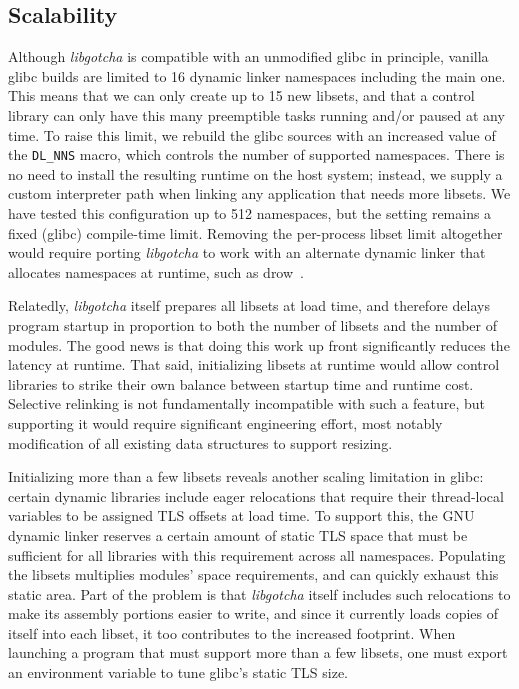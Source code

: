 \subsection{Scalability}
\label{sec:libgotcha:scalability}

Although \textit{libgotcha} is compatible with an unmodified glibc in principle,
vanilla glibc builds are limited to 16 dynamic linker namespaces including the main
one.  This means that we can only create up to 15 new libsets, and that a control
library can only have this many preemptible tasks running and/or paused at any time.
To raise this limit, we rebuild the glibc sources with an increased value of
the \texttt{DL\_NNS} macro, which controls the number of supported namespaces.  There
is no need to install the resulting runtime on the host system; instead, we supply a
custom interpreter path when linking any application that needs more libsets.  We
have tested this configuration up to 512 namespaces, but the setting remains a fixed
(glibc)
compile-time limit.  Removing the per-process libset limit altogether would require
porting \textit{libgotcha} to work with an alternate dynamic linker that allocates
namespaces at runtime, such as drow~\cite{www-drow-loader}.

Relatedly, \textit{libgotcha} itself prepares all libsets at load time, and therefore
delays program startup in proportion to both the number of libsets and the number of
modules.  The good news is that doing this work up front significantly reduces the
latency at runtime.  That said, initializing libsets at runtime would allow control
libraries to strike their own balance between startup time and runtime cost.
Selective relinking is not fundamentally incompatible with such a feature, but
supporting it would require significant engineering effort, most notably modification
of all existing data structures to support resizing.

Initializing more than a few libsets reveals another scaling limitation in glibc:\@
certain dynamic libraries include eager relocations that require their thread-local
variables to be assigned TLS offsets at load time.  To support this, the GNU dynamic
linker reserves a certain amount of static TLS space that must be sufficient for all
libraries with this requirement across all namespaces.  Populating the libsets
multiplies modules' space requirements, and can quickly exhaust this static area.
Part of the problem is that \textit{libgotcha} itself includes such relocations to
make its assembly portions easier to write, and since it currently loads copies of
itself into each libset, it too contributes to the increased footprint.  When
launching a program
that must support more than a few libsets, one must export an environment variable
to tune glibc's static TLS size.


